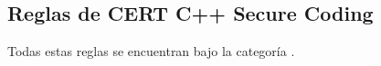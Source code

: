 \subsection{Reglas de CERT C++ Secure Coding}

Todas estas reglas se encuentran bajo la categoría .
